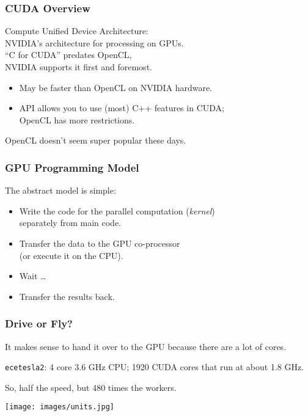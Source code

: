 \begin{frame}
  \frametitle{CUDA Overview}
  

     Compute Unified Device Architecture:\\
     NVIDIA's architecture for processing on GPUs.\\[1em]

     ``C for CUDA'' predates OpenCL,\\
     NVIDIA supports it first and foremost.
      \begin{itemize}
        \item May be faster than OpenCL on NVIDIA hardware.
        \item API allows you to use (most) C++ features in CUDA; \\
          OpenCL has more restrictions.
      \end{itemize}

     OpenCL doesn't seem super popular these days.

\end{frame}

\begin{frame}
  \frametitle{GPU Programming Model}



  The abstract model is simple:

  \begin{itemize}
    \item Write the code for the parallel computation ({\it kernel}) \\
      \qquad separately from main code.
    \item Transfer the data to the GPU co-processor \\
      \qquad (or execute it on the CPU).
    \item Wait \ldots
    \item Transfer the results back.
  \end{itemize}

\end{frame}


\begin{frame}
\frametitle{Drive or Fly?}

It makes sense to hand it over to the GPU because there are a lot of cores.

\texttt{ecetesla2}: 4 core 3.6 GHz CPU; 1920 CUDA cores that run at about 1.8 GHz. 

So, half the speed, but 480 times the workers. 

\begin{center}
	\texttt{[image: images/units.jpg]}
\end{center}

\end{frame}


